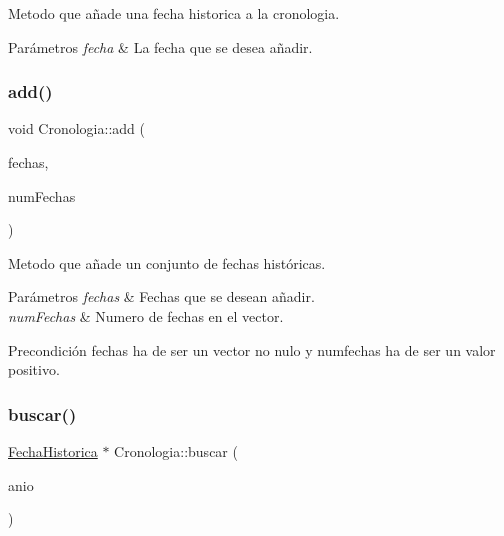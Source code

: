 Metodo que añade una fecha historica a la cronologia. 


\begin{DoxyParams}{Parámetros}
{\em fecha} & La fecha que se desea añadir. \\
\hline
\end{DoxyParams}
\mbox{\label{classCronologia_a708c7d129a7a1b68091f870aa93d96ee}} 
\subsubsection{\texorpdfstring{add()}{add()}\hspace{0.1cm}{\footnotesize\ttfamily [2/2]}}
{\footnotesize\ttfamily void Cronologia\+::add (\begin{DoxyParamCaption}\item[{const \hyperlink{classFechaHistorica}{Fecha\+Historica} $\ast$}]{fechas,  }\item[{int}]{num\+Fechas }\end{DoxyParamCaption})}



Metodo que añade un conjunto de fechas históricas. 


\begin{DoxyParams}{Parámetros}
{\em fechas} & Fechas que se desean añadir. \\
\hline
{\em num\+Fechas} & Numero de fechas en el vector. \\
\hline
\end{DoxyParams}
\begin{DoxyPrecond}{Precondición}
fechas ha de ser un vector no nulo y numfechas ha de ser un valor positivo. 
\end{DoxyPrecond}
\mbox{\label{classCronologia_abd78c892efd74f3e1138a418772bc21c}} 
\subsubsection{\texorpdfstring{buscar()}{buscar()}}
{\footnotesize\ttfamily \hyperlink{classFechaHistorica}{Fecha\+Historica} $\ast$ Cronologia\+::buscar (\begin{DoxyParamCaption}\item[{int}]{anio }\end{DoxyParamCaption})\hspace{0.3cm}{\ttfamily [private]}}



